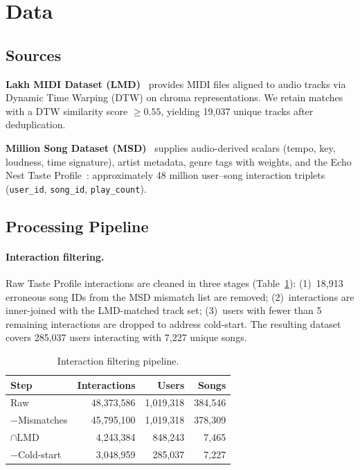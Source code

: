 \section{Data}
\label{sec:data}

\subsection{Sources}

\textbf{Lakh MIDI Dataset (LMD)}~\cite{raffel2016lakh} provides MIDI files aligned to audio tracks via Dynamic Time Warping (DTW) on chroma representations. We retain matches with a DTW similarity score $\geq 0.55$, yielding 19,037 unique tracks after deduplication.

\textbf{Million Song Dataset (MSD)}~\cite{msd2011} supplies audio-derived scalars (tempo, key, loudness, time signature), artist metadata, genre tags with weights, and the Echo Nest Taste Profile~\cite{echonest2011}: approximately 48 million user--song interaction triplets (\texttt{user\_id}, \texttt{song\_id}, \texttt{play\_count}).

\subsection{Processing Pipeline}

\paragraph{Interaction filtering.} Raw Taste Profile interactions are cleaned in three stages (Table~\ref{tab:filtering}): (1)~18,913 erroneous song IDs from the MSD mismatch list are removed; (2)~interactions are inner-joined with the LMD-matched track set; (3)~users with fewer than 5 remaining interactions are dropped to address cold-start. The resulting dataset covers 285,037 users interacting with 7,227 unique songs.

\begin{table}[h]
\centering\footnotesize
\caption{Interaction filtering pipeline.}
\label{tab:filtering}
\setlength{\tabcolsep}{5pt}
\renewcommand{\arraystretch}{1.1}
\begin{tabular}{lrrr}
\toprule
\textbf{Step} & \textbf{Interactions} & \textbf{Users} & \textbf{Songs}\\
\midrule
Raw              & 48,373,586 & 1,019,318 & 384,546\\
$-$Mismatches   & 45,795,100 & 1,019,318 & 378,309\\
$\cap$LMD       & 4,243,384  &   848,243 &   7,465\\
$-$Cold-start   & 3,048,959  &   285,037 &   7,227\\
\bottomrule
\end{tabular}
\end{table}

